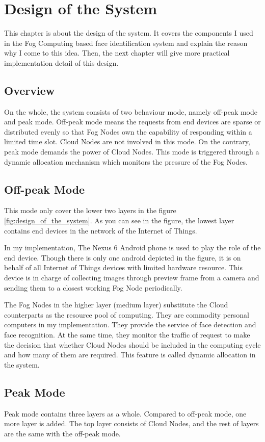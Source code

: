 \chapter{Design of the System} \label{chap:design}
This chapter is about the design of the system. It covers the components I used in the Fog Computing based face identification system and explain the reason why I come to this idea. Then, the next chapter will give more practical implementation detail of this design.

\section{Overview}
On the whole, the system consists of two behaviour mode, namely off-peak mode and peak mode. Off-peak mode means the requests from end devices are sparse or distributed evenly so that Fog Nodes own the capability of responding within a limited time slot. Cloud Nodes are not involved in this mode. On the contrary, peak mode demands the power of Cloud Nodes. This mode is triggered through a dynamic allocation mechanism which monitors the pressure of the Fog Nodes.

\section{Off-peak Mode}
This mode only cover the lower two layers in the figure \ref{fig:design_of_the_system}. As you can see in the figure, the lowest layer contains end devices in the network of the Internet of Things. 

In my implementation, The Nexus 6 Android phone is used to play the role of the end device. Though there is only one android depicted in the figure, it is on behalf of all Internet of Things devices with limited hardware resource. This device is in charge of collecting images through preview frame from a camera and sending them to a closest working Fog Node periodically.

The Fog Nodes in the higher layer (medium layer) substitute the Cloud counterparts as the resource pool of computing. They are commodity personal computers in my implementation. They provide the service of face detection and face recognition. At the same time, they monitor the traffic of request to make the decision that whether Cloud Nodes should be included in the computing cycle and how many of them are required. This feature is called dynamic allocation in the system.

\section{Peak Mode}
Peak mode contains three layers as a whole. Compared to off-peak mode, one more layer is added. The top layer consists of Cloud Nodes, and the rest of layers are the same with the off-peak mode.

